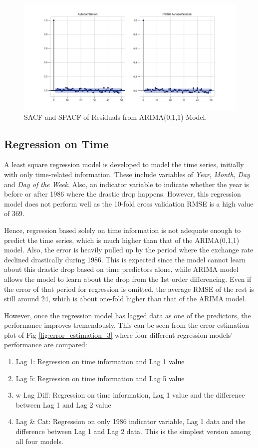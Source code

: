 \documentclass[]{article}
\begin{document}
\begin{figure}[hbtp]
	\centering
	\includegraphics[width=1\columnwidth]{../Figures/sacf_n_spacf_after_arma.pdf}
	\caption{SACF and SPACF of Residuals from ARIMA(0,1,1) Model.}
	\label{fig:sacf_n_spacf_after_arma}
\end{figure}
%

\subsection{Regression on Time}
A least square regression model is developed to model the time series, initially with only time-related information. These include variables of \textit{Year}, \textit{Month}, \textit{Day} and \textit{Day of the Week}. Also, an indicator variable to indicate whether the year is before or after 1986 where the drastic drop happens. However, this regression model does not perform well as the 10-fold cross validation RMSE is a high value of 369. 

Hence, regression based solely on time information is not adequate enough to predict the time series, which is much higher than that of the ARIMA(0,1,1) model. Also, the error is heavily pulled up by the period where the exchange rate declined drastically during 1986. This is expected since the model cannot learn about this drastic drop based on time predictors alone, while ARIMA model allows the model to learn about the drop from the 1st order differencing. Even if the error of that period for regression is omitted, the average RMSE of the rest is still around 24, which is about one-fold higher than that of the ARIMA model.

However, once the regression model has lagged data as one of the predictors, the performance improves tremendously. This can be seen from the error estimation plot of Fig \ref{fig:error_estimation_3} where four different regression models' performance are compared:
\begin{enumerate}
	\item Lag 1: Regression on time information and Lag 1 value
	\item Lag 5: Regression on time information and Lag 5 value
	\item w Lag Diff: Regression on time information, Lag 1 value and the difference between Lag 1 and Lag 2 value
	\item  Lag \& Cat: Regression on only 1986 indicator variable, Lag 1 data and the difference between Lag 1 and Lag 2 data. This is the simplest version among all four models.
\end{enumerate}
\end{document}
